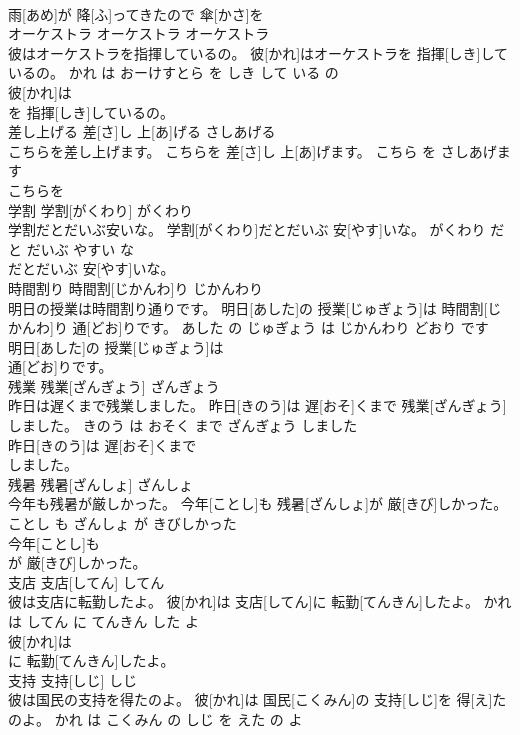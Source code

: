 \documentclass[8pt]{extreport}
\begin{document}
\begin{CJK}{UTF8}{min}
\\	雨[あめ]が 降[ふ]ってきたので 傘[かさ]を
\\	オーケストラ	オーケストラ	オーケストラ	
\\	彼はオーケストラを指揮しているの。	彼[かれ]はオーケストラを 指揮[しき]しているの。	かれ は おーけすとら を しき して いる の	
\\	彼[かれ]は
\\	を 指揮[しき]しているの。			
\\	差し上げる	差[さ]し 上[あ]げる	さしあげる	
\\	こちらを差し上げます。	こちらを 差[さ]し 上[あ]げます。	こちら を さしあげます	
\\	こちらを
\\	学割	学割[がくわり]	がくわり	
\\	学割だとだいぶ安いな。	学割[がくわり]だとだいぶ 安[やす]いな。	がくわり だ と だいぶ やすい な	
\\	だとだいぶ 安[やす]いな。			
\\	時間割り	時間割[じかんわ]り	じかんわり	
\\	明日の授業は時間割り通りです。	明日[あした]の 授業[じゅぎょう]は 時間割[じかんわ]り 通[どお]りです。	あした の じゅぎょう は じかんわり どおり です	
\\	明日[あした]の 授業[じゅぎょう]は
\\	通[どお]りです。			
\\	残業	残業[ざんぎょう]	ざんぎょう	
\\	昨日は遅くまで残業しました。	昨日[きのう]は 遅[おそ]くまで 残業[ざんぎょう]しました。	きのう は おそく まで ざんぎょう しました	
\\	昨日[きのう]は 遅[おそ]くまで
\\	しました。			
\\	残暑	残暑[ざんしょ]	ざんしょ	
\\	今年も残暑が厳しかった。	今年[ことし]も 残暑[ざんしょ]が 厳[きび]しかった。	ことし も ざんしょ が きびしかった	
\\	今年[ことし]も
\\	が 厳[きび]しかった。			
\\	支店	支店[してん]	してん	
\\	彼は支店に転勤したよ。	彼[かれ]は 支店[してん]に 転勤[てんきん]したよ。	かれ は してん に てんきん した よ	
\\	彼[かれ]は
\\	に 転勤[てんきん]したよ。			
\\	支持	支持[しじ]	しじ	
\\	彼は国民の支持を得たのよ。	彼[かれ]は 国民[こくみん]の 支持[しじ]を 得[え]たのよ。	かれ は こくみん の しじ を えた の よ	

\end{CJK}
\end{document}
